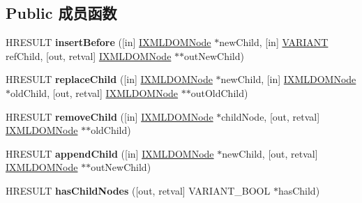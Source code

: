 \subsection*{Public 成员函数}
\begin{DoxyCompactItemize}
\item 
\mbox{\label{interface_i_x_m_l_d_o_m_node_a1555a3bc8046d234f5cad56a314beb8f}} 
H\+R\+E\+S\+U\+LT {\bfseries insert\+Before} (\mbox{[}in\mbox{]} \hyperlink{interface_i_x_m_l_d_o_m_node}{I\+X\+M\+L\+D\+O\+M\+Node} $\ast$new\+Child, \mbox{[}in\mbox{]} \hyperlink{structtag_v_a_r_i_a_n_t}{V\+A\+R\+I\+A\+NT} ref\+Child, \mbox{[}out, retval\mbox{]} \hyperlink{interface_i_x_m_l_d_o_m_node}{I\+X\+M\+L\+D\+O\+M\+Node} $\ast$$\ast$out\+New\+Child)
\item 
\mbox{\label{interface_i_x_m_l_d_o_m_node_a274416158c39e8d71d9619f5fd9f5ddb}} 
H\+R\+E\+S\+U\+LT {\bfseries replace\+Child} (\mbox{[}in\mbox{]} \hyperlink{interface_i_x_m_l_d_o_m_node}{I\+X\+M\+L\+D\+O\+M\+Node} $\ast$new\+Child, \mbox{[}in\mbox{]} \hyperlink{interface_i_x_m_l_d_o_m_node}{I\+X\+M\+L\+D\+O\+M\+Node} $\ast$old\+Child, \mbox{[}out, retval\mbox{]} \hyperlink{interface_i_x_m_l_d_o_m_node}{I\+X\+M\+L\+D\+O\+M\+Node} $\ast$$\ast$out\+Old\+Child)
\item 
\mbox{\label{interface_i_x_m_l_d_o_m_node_a861d42197601ecaec97368824f191905}} 
H\+R\+E\+S\+U\+LT {\bfseries remove\+Child} (\mbox{[}in\mbox{]} \hyperlink{interface_i_x_m_l_d_o_m_node}{I\+X\+M\+L\+D\+O\+M\+Node} $\ast$child\+Node, \mbox{[}out, retval\mbox{]} \hyperlink{interface_i_x_m_l_d_o_m_node}{I\+X\+M\+L\+D\+O\+M\+Node} $\ast$$\ast$old\+Child)
\item 
\mbox{\label{interface_i_x_m_l_d_o_m_node_aa92da8dced3c8247079428b8aa62a08a}} 
H\+R\+E\+S\+U\+LT {\bfseries append\+Child} (\mbox{[}in\mbox{]} \hyperlink{interface_i_x_m_l_d_o_m_node}{I\+X\+M\+L\+D\+O\+M\+Node} $\ast$new\+Child, \mbox{[}out, retval\mbox{]} \hyperlink{interface_i_x_m_l_d_o_m_node}{I\+X\+M\+L\+D\+O\+M\+Node} $\ast$$\ast$out\+New\+Child)
\item 
\mbox{\label{interface_i_x_m_l_d_o_m_node_a6bc003c935ea69ef02ab80a81cc55d5b}} 
H\+R\+E\+S\+U\+LT {\bfseries has\+Child\+Nodes} (\mbox{[}out, retval\mbox{]} V\+A\+R\+I\+A\+N\+T\+\_\+\+B\+O\+OL $\ast$has\+Child)

\end{DoxyCompactItemize}
